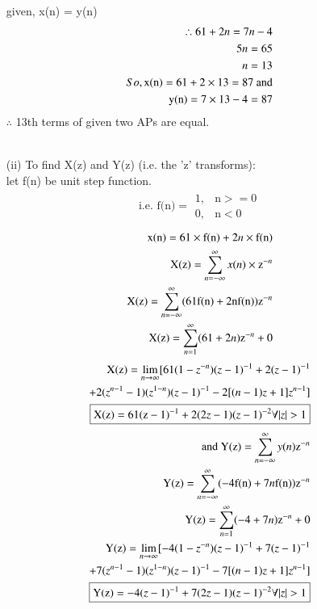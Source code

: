 \documentclass[journal,12pt,twocolumn]{IEEEtran}
\theoremstyle{remark}
\begin{document}
\begin{enumerate}
\begin{align}
\end{align}
given, x(n) = y(n)\\
\begin{align}
\therefore 61 + 2n = 7n -4\\
\notag 5n = 65\\
n = 13\\
\notag So, \text{x(n)} = 61 + 2\times13 = 87 \text{ and}\\
\notag \text{y(n)} = 7\times13 - 4 = 87
\end{align}
$ \therefore$ 13th terms of given two APs are equal.\\\\
\vspace{0.5cm}
\item[(ii)]
To find X(z) and Y(z) (i.e. the 'z' transforms):\\
let f(n) be unit step function.\\
\begin{align}
\text{i.e. f(n)}=
\begin{array}{lr}
    1,&\text{n}>=0\\
    0,&\text{n}<0
\end{array}
\end{align}
\begin{align}
\text{x(n)} = 61\times \text{f(n)} + 2n\times \text{f(n)}\\
\text{X(z)} = \sum_{n=-\infty}^{\infty} x(n)\times \text{z}^{-n}\\
\notag \text{X(z)} = \sum_{n=-\infty}^{\infty} (61\text{f(n)} + 2\text{nf(n)})\text{z}^{-n}\\
\text{X(z)} = \sum_{n=1}^{\infty} (61 + 2n)\text{z}^{-n} + 0
\end{align}
\begin{align}
\notag \text{X(z)} = \lim_{n\to\infty} [61(1-z^{-n})(z-1)^{-1}+ 2(z-1)^{-1}\\
+ 2(z^{n-1}-1)(z^{1-n})(z-1)^{-1}-2[(n-1)z+1]z^{n-1}]\\
\boxed{\text{X(z)} = 61(\text{z}-1)^{-1} + 2(2z-1)(z-1)^{-2}  \forall  |z|>1}
\end{align}
\begin{align}
\text{and Y(z)} = \sum_{n=-\infty}^{\infty} y(n)\text{z}^{-n}\\
\notag \text{Y(z)} = \sum_{n=-\infty}^{\infty} (-4\text{f(n)} + 7n\text{f(n)})\text{z}^{-n}\\
\notag \text{Y(z)} = \sum_{n=1}^{\infty} (-4 + 7n)\text{z}^{-n} + 0\\
\notag \text{Y(z)} = \lim_{n\to\infty} [-4(1-z^{-n})(z-1)^{-1}+ 7(z-1)^{-1}\\
+ 7(z^{n-1}-1)(z^{1-n})(z-1)^{-1}-7[(n-1)z+1]z^{n-1}]\\
\boxed{\text{Y(z)} = -4(z-1)^{-1} + 7(2z-1)(z-1)^{-2} \forall  |z|>1}
\end{align}
\end{enumerate}
\end{document}
